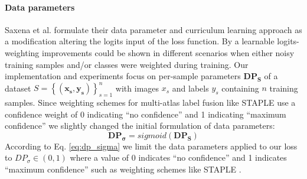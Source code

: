     \paragraph{\textbf{Data parameters}}
        \label{sec:data_parameters}
        Saxena et al. \citep{saxena2019data} formulate their data parameter and curriculum learning approach as a modification altering the logits input of the loss function.
        By a learnable logits-weighting improvements could be shown in different scenarios when either noisy training samples and/or classes were weighted during training.
        Our implementation and experiments focus on per-sample parameters \(\mathbf{DP_{S}}\) of a dataset \(S=\left\{\left(\mathbf{x_s}, \mathbf{y_s}\right)\right\}_{s=1}^{n}\) with images \(x_s\) and labels \(y_s\) containing \(n\) training samples.
        Since weighting schemes for multi-atlas label fusion like STAPLE \citep{warfield2004simultaneous} use a confidence weight of 0 indicating “no confidence” and 1 indicating “maximum confidence” we slightly changed the initial formulation of data parameters:
        \begin{equation}
            \label{eq:dp_sigma}
            \mathbf{DP_{\sigma}} = sigmoid\left(\mathbf{DP_S}\right)
        \end{equation}
        According to Eq. \ref{eq:dp_sigma} we limit the data parameters applied to our loss to \(DP_{\sigma} \in (0,1)\)  where a value of 0 indicates “no confidence” and 1 indicates “maximum confidence” such as weighting schemes like STAPLE \citep{warfield2004simultaneous}.
